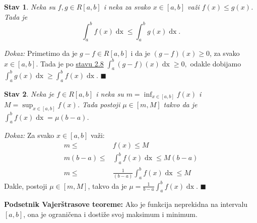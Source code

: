 \documentclass{article}
\newtheorem{stav}{Stav}[section]
\DeclareMathOperator{\dx}{dx}
\begin{document}
\begin{stavbox}
    \label{stav_2.10}
    \begin{stav}
        Neka su $f, g \in R\left[a,b\right]$ i neka za svako $x \in \left[a, b\right]$ važi $f\left(x\right) \leq g\left(x\right)$. Tada je $$\displaystyle \int^b_a f\left(x\right) \dx \leq \int^b_a g\left(x\right)\dx.$$
    \end{stav}
\end{stavbox}

\textit{Dokaz:} Primetimo da je $g-f \in R\left[a, b\right]$ i da je $\left(g-f\right)\left(x\right) \geq 0$, za svako $x\in\left[a,b\right]$. Tada je po
\hyperref[stav_2.8]{stavu 2.8} $\displaystyle \int^b_a \left(g-f\right)\left(x\right)\dx \geq 0,$
odakle dobijamo $\displaystyle \int^b_a g\left(x\right)\dx \geq  \int^b_a f\left(x\right)\dx $.
\null\hfill $\blacksquare$\par

\begin{stavbox}
    \label{stav_2.11}
    \begin{stav}
        Neka je $f \in R\left[a, b\right]$ i neka su $\displaystyle m = \inf_{x\in \left[a, b\right]} f\left(x\right)$ i $\displaystyle M = \sup_{x \in \left[a,b\right]} f\left(x\right)$. Tada postoji $\mu \in \left[m, M\right]$ takvo da je $\displaystyle \int^b_a f\left(x\right) \dx = \mu\left(b-a\right)$.
    \end{stav}
\end{stavbox}

\textit{Dokaz:} Za svako $x \in \left[a, b\right]$ važi:
\begin{align*}
    m \leq                 & f\left(x\right) \leq M                                       \\
    m\left(b-a\right) \leq & \int^b_a f\left(x\right)\dx \leq M\left(b-a\right)           \\
    m \leq                 & \frac{1}{\left(b-a\right)}\int^b_a f\left(x\right)\dx \leq M
\end{align*}
Dakle, postoji $\mu\in\left[m, M\right]$, takvo da je $\displaystyle \mu=\frac{1}{b-a}\int^b_a f\left(x\right)\dx$.
\null\hfill $\blacksquare$\par

\begin{teoremabox}
    \label{podsetnik_teoreme_3}
    \textbf{Podsetnik Vajerštrasove teoreme:} Ako je funkcija neprekidna na intervalu $\left[a,b\right]$, ona je ograničena i
    dostiže svoj maksimum i minimum.
\end{teoremabox}
\end{document}
